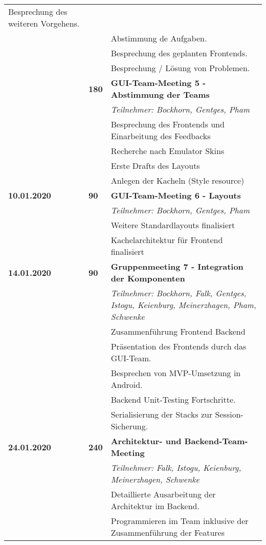 {\begin{longtable}{|l|l|p{11cm}|}
			Besprechung des weiteren Vorgehens.
			\\ & &
			Abstimmung de Aufgaben.
			\\ & &
			Besprechung des geplanten Frontends.
			\\ & &
			Besprechung / Lösung von Problemen.
		\\ \cline{2-3}
		& \textbf{\hfill180} & \textbf{GUI-Team-Meeting 5 - Abstimmung der Teams} 
			\\ & &
			\small{\textit{Teilnehmer: Bockhorn, Gentges, Pham}}
			\\ & &
			Besprechung des Frontends und Einarbeitung des Feedbacks
			\\ & &
			Recherche nach Emulator Skins
			\\ & &
			Erste Drafts des Layouts
			\\ & &
			Anlegen der Kacheln (Style resource)	
	\\ \hline
		\textbf{10.01.2020} 
			& \textbf{\hfill90} & \textbf{GUI-Team-Meeting 6 - Layouts}
			\\ & &
			\small{\textit{Teilnehmer: Bockhorn, Gentges, Pham}}
			\\ & &
			Weitere Standardlayouts finalisiert
			\\ & &
			Kachelarchitektur für Frontend finalisiert			
	\\ \hline
		\textbf{14.01.2020} 
			& \textbf{\hfill90} & \textbf{Gruppenmeeting 7 - Integration der Komponenten}
			\\ & &
			\small{\textit{Teilnehmer: Bockhorn, Falk, Gentges, Istogu, Keienburg, Meinerzhagen, Pham, Schwenke}}
			\\ & &
			Zusammenführung Frontend Backend
			\\ & &
			Präsentation des Frontends durch das GUI-Team.
			\\ & &
			Besprechen von MVP-Umsetzung in Android.
			\\ & &
			Backend Unit-Testing Fortschritte.
			\\ & &
			Serialisierung der Stacks zur Session-Sicherung.
	\\ \hline
		\textbf{24.01.2020} & 
			\textbf{\hfill240} & \textbf{Architektur- und Backend-Team-Meeting}
			\\ & &
			\small{\textit{Teilnehmer: Falk, Istogu, Keienburg, Meinerzhagen, Schwenke}}
			\\ & &
			Detaillierte Ausarbeitung der Architektur im Backend.
			\\ & &
			Programmieren im Team inklusive der Zusammenführung der Features

\end{longtable}}

